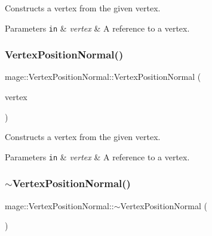 Constructs a vertex from the given vertex.


\begin{DoxyParams}[1]{Parameters}
\mbox{\tt in}  & {\em vertex} & A reference to a vertex. \\
\hline
\end{DoxyParams}
\hypertarget{structmage_1_1_vertex_position_normal_a23ca5ed9238a02837b44b97c5248dc12}{}\label{structmage_1_1_vertex_position_normal_a23ca5ed9238a02837b44b97c5248dc12} 
\subsubsection{\texorpdfstring{Vertex\+Position\+Normal()}{VertexPositionNormal()}\hspace{0.1cm}{\footnotesize\ttfamily [4/4]}}
{\footnotesize\ttfamily mage\+::\+Vertex\+Position\+Normal\+::\+Vertex\+Position\+Normal (\begin{DoxyParamCaption}\item[{\hyperlink{structmage_1_1_vertex_position_normal}{Vertex\+Position\+Normal} \&\&}]{vertex }\end{DoxyParamCaption})\hspace{0.3cm}{\ttfamily [default]}}

Constructs a vertex from the given vertex.


\begin{DoxyParams}[1]{Parameters}
\mbox{\tt in}  & {\em vertex} & A reference to a vertex. \\
\hline
\end{DoxyParams}
\hypertarget{structmage_1_1_vertex_position_normal_a664123217b7e8d18769ea46fc318e0c1}{}\label{structmage_1_1_vertex_position_normal_a664123217b7e8d18769ea46fc318e0c1} 
\subsubsection{\texorpdfstring{$\sim$\+Vertex\+Position\+Normal()}{~VertexPositionNormal()}}
{\footnotesize\ttfamily mage\+::\+Vertex\+Position\+Normal\+::$\sim$\+Vertex\+Position\+Normal (\begin{DoxyParamCaption}{ }\end{DoxyParamCaption})\hspace{0.3cm}{\ttfamily [default]}}

